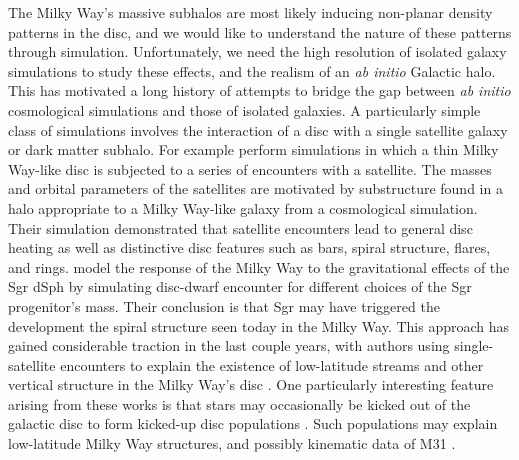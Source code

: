 The Milky Way's massive subhalos are most likely inducing non-planar density patterns in the disc, and we would like to understand the nature of these patterns through simulation. Unfortunately, we need the high resolution of isolated galaxy simulations to study these effects, and the realism of an \textit{ab initio} Galactic halo.  This has motivated a long history of attempts to bridge the gap between {\it ab initio} cosmological simulations and those of isolated galaxies.  A particularly simple class of simulations involves the interaction of a disc
with a single satellite galaxy or dark matter subhalo.  For example \citet{kazantzidis2008} perform simulations in which a thin Milky Way-like disc is subjected to a series of encounters with a satellite.  The masses and orbital parameters of the satellites are motivated by substructure found in a halo appropriate to a Milky Way-like galaxy from a cosmological simulation.  Their simulation demonstrated that satellite encounters lead to general disc heating as well as distinctive disc features such as bars, spiral structure, flares, and rings.  \citet{purcell2011} model the response of the Milky Way to the gravitational effects of
the Sgr dSph by simulating disc-dwarf encounter for different choices of the Sgr progenitor's mass.  Their conclusion is that Sgr may have triggered the development the spiral structure seen today in the Milky Way.  This approach has gained considerable traction in the last couple years, with authors using single-satellite encounters to explain the existence of low-latitude streams and other vertical structure in the Milky Way's disc \citep[for example]{widrow_2014, dlv_2015, donghia_2016, laporte_2016, laporte_2018}. One particularly interesting feature arising from these works is that stars may occasionally be kicked out of the galactic disc to form kicked-up disc populations \citep{johnston_kud_review, laporte_2019_feathers}. Such populations may explain low-latitude Milky Way structures, and possibly kinematic data of M31 \citep{dorman_2013_m31}.


